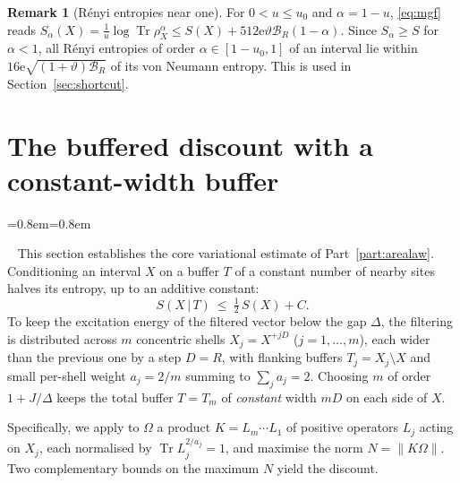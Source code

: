 \documentclass[aps,prx,reprint,superscriptaddress,floatfix,nofootinbib,longbibliography,amsmath,amssymb]{revtex4-2}
\newcommand{\Tr}{\operatorname{Tr}}
\newcommand{\norm}[1]{\lVert #1\rVert}
\newcommand{\cB}{\mathcal B}
\newcommand{\Om}{\Omega}
\newcommand{\e}{\mathrm e}
\theoremstyle{plain}
\theoremstyle{definition}
\newtheorem{remark}[theorem]{Remark}
\newenvironment{inwords}{%
  \par\medskip\noindent
  \begin{list}{}{\leftmargin=0.8em\rightmargin=0.8em}
  \item\relax
  \noindent{\sffamily\bfseries\color{blue!40!black}In words.}\ \sffamily\small}{%
  \end{list}\par\medskip}
\begin{document}
\begin{remark}[Rényi entropies near one]\label{rem:renyi}
For $0<u\le u_0$ and $\alpha=1-u$, \eqref{eq:mgf} reads
$S_\alpha(X)=\frac{1}{u}\log\Tr\rho_X^{\alpha}\le S(X)+512\e\vartheta\cB_R(1-\alpha)$.
Since $S_\alpha\ge S$ for $\alpha<1$, all Rényi entropies of order
$\alpha\in[1-u_0,1]$ of an interval lie within $16\e\sqrt{(1+\vartheta)\cB_R}$ of its von
Neumann entropy. This is used in Section~\ref{sec:shortcut}.
\end{remark}

\section{The buffered discount with a constant-width buffer}\label{sec:buffer}

\begin{inwords}
This section establishes the core variational estimate of Part~\ref{part:arealaw}.
Conditioning an interval $X$ on a buffer $T$ of a constant number of
nearby sites halves its entropy, up to an additive constant:
\[
 S(X\,|\,T)\ \le\ \tfrac12\,S(X)+C .
\]
To keep the excitation energy of the filtered vector below the gap
$\Delta$, the filtering is distributed across $m$ concentric shells
$X_j=X^{+jD}$ ($j=1,\dots,m$), each wider than the previous one by a step $D=R$, with flanking buffers
$T_j=X_j\setminus X$ and small per-shell weight $a_j=2/m$ summing to
$\sum_j a_j=2$. Choosing $m$ of order $1+J/\Delta$ keeps the total buffer
$T=T_m$ of \emph{constant} width $mD$ on each side of $X$.

Specifically, we apply to $\Om$ a product $K=L_m\cdots L_1$ of positive
operators $L_j$ acting on $X_j$, each normalised by $\Tr L_j^{2/a_j}=1$,
and maximise the norm $N=\norm{K\Om}$. Two complementary bounds on the
maximum $N$ yield the discount.


\end{inwords}
\end{document}

